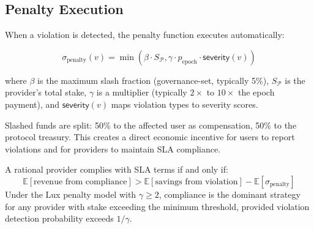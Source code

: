 \subsection{Penalty Execution}

When a violation is detected, the penalty function executes automatically:

\begin{equation}\label{eq:penalty}
    \sigma_{\text{penalty}}(v) = \min\left(\beta \cdot S_{\mathcal{P}}, \gamma \cdot p_{\text{epoch}} \cdot \mathsf{severity}(v)\right)
\end{equation}

where $\beta$ is the maximum slash fraction (governance-set, typically 5\%),
$S_{\mathcal{P}}$ is the provider's total stake, $\gamma$ is a multiplier
(typically $2\times$ to $10\times$ the epoch payment), and $\mathsf{severity}(v)$
maps violation types to severity scores.

Slashed funds are split: 50\% to the affected user as compensation, 50\% to
the protocol treasury. This creates a direct economic incentive for users to
report violations and for providers to maintain SLA compliance.

\begin{proposition}
A rational provider complies with SLA terms if and only if:
\begin{equation}
    \mathbb{E}[\text{revenue from compliance}] > \mathbb{E}[\text{savings from violation}] - \mathbb{E}[\sigma_{\text{penalty}}]
\end{equation}
Under the Lux penalty model with $\gamma \geq 2$, compliance is the dominant
strategy for any provider with stake exceeding the minimum threshold, provided
violation detection probability exceeds $1/\gamma$.
\end{proposition}

